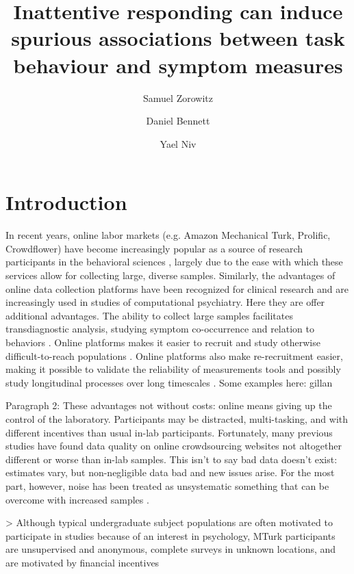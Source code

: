 \documentclass[a4paper,notitlepage,12pt]{article}
\author[1]{Samuel Zorowitz}
\author[1,2]{Daniel Bennett}
\author[1,3]{Yael Niv}
\affil[1]{Princeton Neuroscience Institute, Princeton University, USA}
\affil[2]{Department of Psychiatry, Monash University, Australia}
\affil[3]{Department of Psychology, Princeton University, USA}
\title{Inattentive responding can induce spurious associations between task behaviour and symptom measures}
\date{}
\begin{document}
\maketitle


\clearpage

\setlength{\parindent}{0em}
\setlength{\parskip}{1em}

\section{Introduction}

In recent years, online labor markets (e.g. Amazon Mechanical Turk, Prolific, Crowdflower) have become increasingly popular as a source of research participants in the behavioral sciences \cite{stewart2017crowdsourcing}, largely due to the ease with which these services allow for collecting large, diverse samples. Similarly, the advantages of online data collection platforms have been recognized for clinical research \cite{chandler2016conducting} and are increasingly used in studies of computational psychiatry. Here they are offer additional advantages. The ability to collect large samples facilitates transdiagnostic analysis, studying symptom co-occurrence and relation to behaviors \cite{gillan2016taking, rutledge2019machine}. Online platforms makes it easier to recruit and study otherwise difficult-to-reach populations \cite{strickland2019use}. Online platforms also make re-recruitment easier, making it possible to validate the reliability of measurements tools \cite{enkavi2019large} and possibly study longitudinal processes over long timescales \cite{kothe2019retention}. Some examples here: gillan


Paragraph 2: These advantages not without costs: online means giving up the control of the laboratory. Participants may be distracted, multi-tasking, and with different incentives than usual in-lab participants. Fortunately, many previous studies have found data quality on online crowdsourcing websites not altogether different or worse than in-lab samples. This isn't to say bad data doesn't exist: estimates vary, but non-negligible data bad and new issues arise. For the most part, however, noise has been treated as unsystematic something that can be overcome with increased samples  \cite{gillan2016taking, chandler2020participant}. 

> Although typical undergraduate subject populations are often motivated to participate in studies because of an interest in psychology, MTurk participants are unsupervised and anonymous, complete surveys in unknown locations, and are motivated by financial incentives
\end{document}
